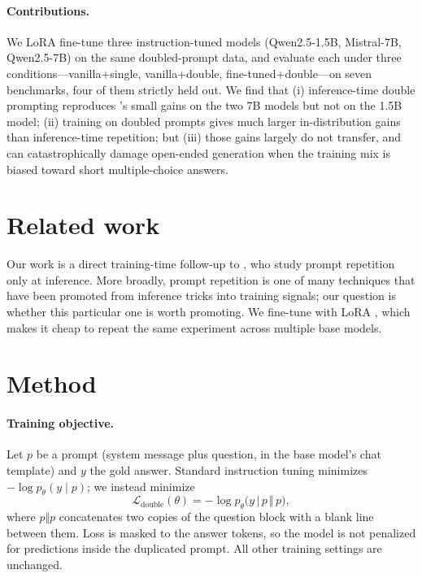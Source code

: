 \documentclass{article}
\begin{document}
\paragraph{Contributions.} We LoRA fine-tune three instruction-tuned
models (Qwen2.5-1.5B, Mistral-7B, Qwen2.5-7B) on the same doubled-prompt
data, and evaluate each under three conditions---vanilla+single,
vanilla+double, fine-tuned+double---on seven benchmarks, four of them
strictly held out. We find that (i) inference-time double prompting
reproduces \citet{leviathan2025}'s small gains on the two 7B models but
not on the 1.5B model; (ii) training on doubled prompts gives much
larger in-distribution gains than inference-time repetition; but (iii)
those gains largely do not transfer, and can catastrophically damage
open-ended generation when the training mix is biased toward short
multiple-choice answers.


\section{Related work}

Our work is a direct training-time follow-up to \citet{leviathan2025},
who study prompt repetition only at inference. More broadly, prompt
repetition is one of many techniques that have been promoted from
inference tricks into training signals; our question is whether this
particular one is worth promoting.
We fine-tune with LoRA \citep{hu2022lora}, which makes it cheap to repeat
the same experiment across multiple base models.


\section{Method}

\paragraph{Training objective.} Let $p$ be a prompt (system message plus
question, in the base model's chat template) and $y$ the gold answer.
Standard instruction tuning minimizes $-\log p_\theta(y \mid p)$; we
instead minimize
\[
  \mathcal{L}_{\text{double}}(\theta)
  = -\log p_\theta\bigl(y \,\big|\, p \,\Vert\, p\bigr),
\]
where $p \Vert p$ concatenates two copies of the question block with a
blank line between them. Loss is masked to the answer tokens, so the
model is not penalized for predictions inside the duplicated prompt.
All other training settings are unchanged.
\end{document}
